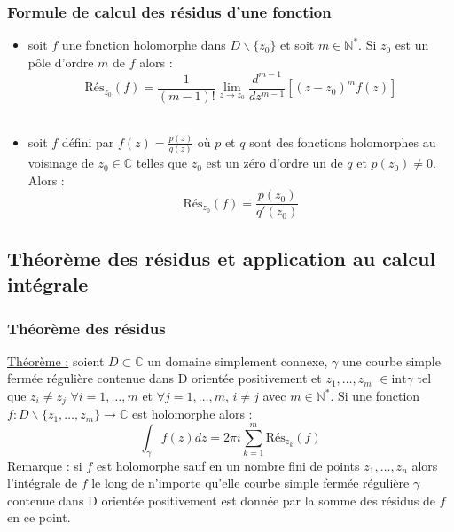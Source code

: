 \documentclass[../main.tex]{subfiles}
\begin{document}
\subsubsection{Formule de calcul des résidus d'une fonction}
\begin{itemize}
    \item soit $f$ une fonction holomorphe dans $D\backslash \{z_0\}$ et soit $m \in \mathbb{N}^*$. Si $z_0$ est un pôle d'ordre $m$ de $f$ alors : \begin{equation}
        \text{Rés}_{z_0}(f) = \frac{1}{(m-1)!} \lim_{z\rightarrow z_0} \frac{d^{m-1}}{dz^{m-1}} [(z-z_0)^m f(z)]
    \end{equation}\\
    \item soit $f$ défini par $f(z) = \frac{p(z)}{q(z)}$ où $p$ et $q$ sont des fonctions holomorphes au voisinage de $z_0 \in \mathbb{C}$ telles que $z_0$ est un zéro d'ordre un de $q$ et $p(z_0)\neq 0$. Alors : \begin{equation}
        \text{Rés}_{z_0}(f) = \frac{p(z_0)}{q'(z_0)}
    \end{equation}
\end{itemize}

\subsection{Théorème des résidus et application au calcul intégrale}
\subsubsection{Théorème des résidus}
\quad \underline{Théorème :} soient $D\subset \mathbb{C}$ un domaine simplement connexe, $\gamma$ une courbe simple fermée régulière contenue dans D orientée positivement et $z_1, \dots, z_m$ $\in \text{int} \gamma$ tel que $z_i \neq z_j$ $\forall i=1,\dots, m$ et $\forall j=1,\dots, m$, $i\neq j$ avec $m\in \mathbb{N}^*$. Si une fonction $f : D \backslash \{ z_1 ,\dots, z_m\} \rightarrow \mathbb{C}$ est holomorphe alors : \\

\begin{equation}
    \int_\gamma f(z) dz = 2\pi i \sum_{k=1}^m \text{Rés}_{z_k}(f)
\end{equation}
\color{gray}Remarque : si $f$ est holomorphe sauf en un nombre fini de points $z_1,\dots, z_n$ alors l'intégrale de $f$ le long de n'importe qu'elle courbe simple fermée régulière $\gamma$ contenue dans D orientée positivement est donnée par la somme des résidus de $f$ en ce point.\color{black}\\
\end{document}
